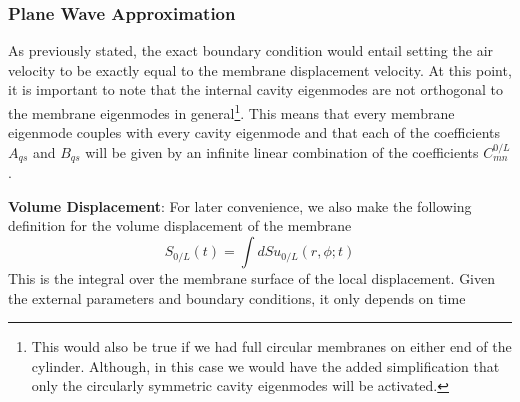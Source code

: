 \subsubsection{Plane Wave Approximation}
As previously stated, the exact boundary condition would entail setting the air velocity to be exactly equal to the membrane displacement velocity. At this point, it is important to
note that the internal cavity eigenmodes are not orthogonal to the membrane eigenmodes in general\footnote{This would also be true if we had full circular membranes on either end of the
cylinder. Although, in this case we would have the added simplification that only the circularly symmetric cavity eigenmodes will be activated.}. This means that every membrane eigenmode
couples with every cavity eigenmode and that each of the coefficients $A_{qs}$ and $B_{qs}$ will be given by an infinite linear combination of the coefficients $C^{0/L}_{mn}$.

\noindent\textbf{Volume Displacement}: For later convenience, we also make the following definition for the volume displacement of the membrane
\begin{equation}\label{volumedisplacementdef}
 S_{0/L}(t)=\int dS u_{0/L}(r,\phi;t)
\end{equation}
This is the integral over the membrane surface of the local displacement. Given the external parameters and boundary conditions, it only depends on time


